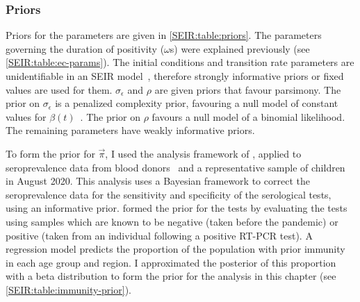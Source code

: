 \documentclass[thesis.tex]{subfiles}
\begin{document}
\subsubsection{Priors} \label{SEIR:sec:priors}

Priors for the parameters are given in \cref{SEIR:table:priors}.
The parameters governing the duration of positivity ($\omega$s) were explained previously (see \cref{SEIR:table:ec-params}).
The initial conditions and transition rate parameters are unidentifiable in an SEIR model~\autocite{dankwaStructural}, therefore strongly informative priors or fixed values are used for them.
$\sigma_\epsilon$ and $\rho$ are given priors that favour parsimony.
The prior on $\sigma_\epsilon$ is a penalized complexity prior, favouring a null model of constant values for $\beta(t)$~\autocite{simpsonPenalising}.
The prior on $\rho$ favours a null model of a binomial likelihood.
The remaining parameters have weakly informative priors.

To form the prior for $\vec{\pi}$, I used the analysis framework of \textcite{amirthalingamSeroprevalence}, applied to seroprevalence data from blood donors~\autocite{amirthalingamSeroprevalence} and a representative sample of children~\autocite{ratcliffeCommunity} in August 2020.
This analysis uses a Bayesian framework to correct the seroprevalence data for the sensitivity and specificity of the serological tests, using an informative prior.
\Textcite{amirthalingamSeroprevalence} formed the prior for the tests by evaluating the tests using samples which are known to be negative (taken before the pandemic) or positive (taken from an individual following a positive RT-PCR test).
A regression model predicts the proportion of the population with prior immunity in each age group and region.
I approximated the posterior of this proportion with a beta distribution to form the prior for the analysis in this chapter (see \cref{SEIR:table:immunity-prior}).
\end{document}
